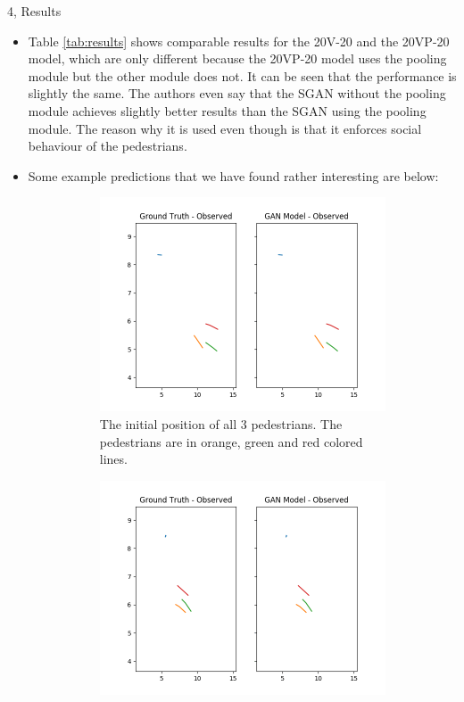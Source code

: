 \documentclass[10pt,a4paper]{article}
\begin{document}
\begin{task}{4, Results}
\begin{itemize}
   \item Table \ref{tab:results} shows comparable results for the 20V-20 and the 20VP-20 model, which are only different because the 20VP-20 model uses the pooling module but the other module does not. It can be seen that the performance is slightly the same. The authors even say that the SGAN without the pooling module achieves slightly better results than the SGAN using the pooling module. The reason why it is used even though is that it enforces social behaviour of the pedestrians.
   \item Some example predictions that we have found rather interesting are below:
\begin{figure}[H]
\centering
\begin{subfigure}[b]{0.475\textwidth}
\centering
\includegraphics[width=\textwidth]{pictures/frames/follow/frame_03_delay-0,35s.png}
\caption[]
{{\small The initial position of all 3 pedestrians. The pedestrians are in orange, green and red colored lines.}}
\label{fig:follow_1}
\end{subfigure}
\hfill
\begin{subfigure}[b]{0.475\textwidth}
\centering
\includegraphics[width=\textwidth]{pictures/frames/follow/frame_11_delay-0,35s.png}

\end{subfigure}
\end{figure}
\end{itemize}
\end{task}
\end{document}
